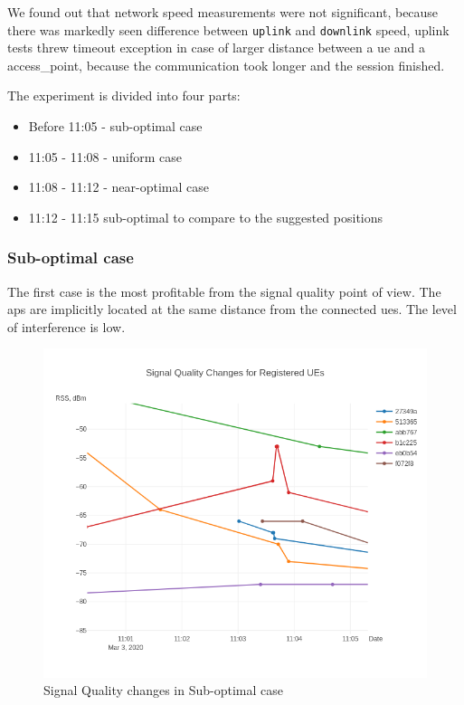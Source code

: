 We found out that network speed measurements were not significant, because there was markedly seen difference between \texttt{uplink} and \texttt{downlink} speed, uplink tests threw timeout exception in case of larger distance between a \gls{ue} and a \gls{access_point}, because the communication took longer and the session finished.

The experiment is divided into four parts:

\begin{itemize}
\tightlist
\item
  Before 11:05 - sub-optimal case
\item
  11:05 - 11:08 - uniform case
\item
  11:08 - 11:12 - near-optimal case
\item
  11:12 - 11:15 sub-optimal to compare to the suggested positions
\end{itemize}

\subsubsection{Sub-optimal case}

The first case is the most profitable from the signal quality point of
view. The \glspl{ap} are implicitly located at the same distance from the
connected \glspl{ue}. The level of interference is low.

\begin{figure}[H]
	\centering
	\includegraphics[width=\linewidth,keepaspectratio]{images/Exp4_Suboptimal.png}
\caption{Signal Quality changes in Sub-optimal case}
\end{figure}

